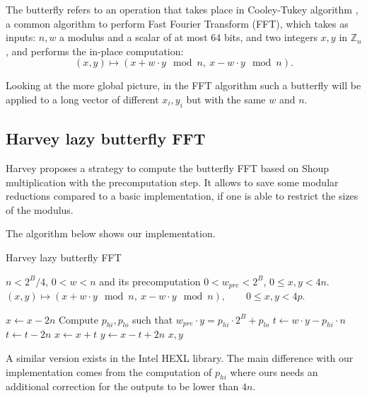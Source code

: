 \documentclass[a4paper]{article}
\begin{document}
The butterfly refers to an operation that takes place in Cooley-Tukey algorithm \cite{Cooley_Tukey_1965}, a common algorithm to perform 
Fast Fourier Transform (FFT), which takes as inputs: $n, w$ a modulus and a scalar of at most 64 bits, and two integers 
$x, y$ in $\mathbb{Z}_n$, and performs the in-place computation:
\[
(x,y) \mapsto (x + w\cdot y \mod n,\ x - w\cdot y \mod n).
\]

Looking at the more global picture, in the FFT algorithm such a butterfly will
be applied to a long vector of different \(x_i, y_i\) but with the same \(w\) and \(n\).


\subsection{Harvey lazy butterfly FFT}

Harvey proposes a strategy\cite{DBLP:journals/corr/abs-1205-2926} to compute the butterfly FFT based on Shoup multiplication
with the precomputation step. It allows to save some modular reductions compared to a basic implementation, if one is able to 
restrict the sizes of the modulus.

\bigskip
The algorithm below shows our implementation.

\begin{algorithm}
    \caption{Harvey lazy butterfly FFT}
    \begin{algorithmic}[1]
        \Require $n < 2^B/4$,
        \Require $0 < w < n$ and its precomputation $0 < w_{pre} < 2^B$,
        \Require $0 \leq x, y < 4n$.
        \Ensure $(x,y) \mapsto (x + w\cdot y \mod n,\ x - w\cdot y \mod n), \qquad 0 \leq x,y < 4p.$

            \State $x \gets x - 2n$
        \EndIf
        \State Compute $p_{hi}, p_{lo}$ such that $w_{pre} \cdot y = p_{hi}\cdot 2^B + p_{lo}$ 
        \State $t \gets w\cdot y - p_{hi}\cdot n$ 
            \State $t \gets t - 2n$
        \EndIf
        \State $x \gets x + t$
        \State $y \gets x - t + 2n$
        \State \Return $x,y$
    \end{algorithmic}
\end{algorithm}

\begin{remark}
    A similar version exists in the Intel HEXL library\cite{boemer2021intelhexlacceleratinghomomorphic}. The main difference with
    our implementation comes from the computation of $p_{hi}$ where ours needs an additional correction for the outputs to be
    lower than $4n$.
\end{remark}
\end{document}
